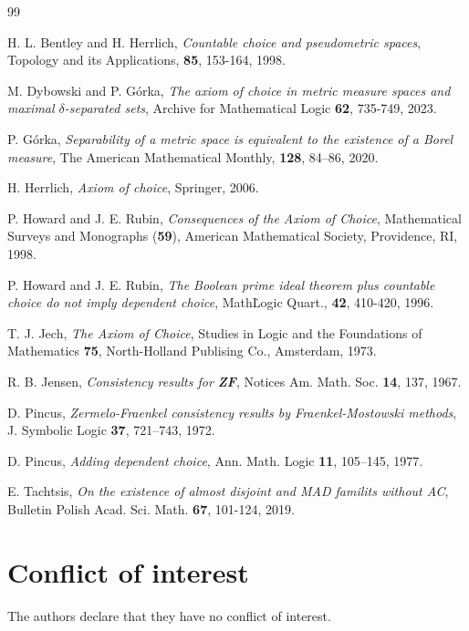 \documentclass[11pt, reqno]{amsart}
\theoremstyle{definition}
\numberwithin{theorem}{section}
\theoremstyle{definition}
\theoremstyle{definition}
\theoremstyle{definition}
\theoremstyle{definition}
\theoremstyle{definition}
\numberwithin{claim}{section}
\theoremstyle{definition}
\theoremstyle{definition}
\theoremstyle{definition}
\theoremstyle{definition}
\theoremstyle{definition}
\theoremstyle{remboldstyle}
\begin{document}

\begin{thebibliography}{99}

 H. L. Bentley and H. Herrlich, \textit{Countable choice and pseudometric spaces}, Topology and its Applications,
\textbf{85}, 153-164, 1998.

 M. Dybowski and P. G\'{o}rka, \textit{The axiom of choice in metric measure spaces and maximal $\delta$-separated sets}, Archive for Mathematical Logic \textbf{62}, 735-749, 2023.

 P. G\'{o}rka, \textit{Separability of a metric space is equivalent to the existence of a Borel measure}, The American Mathematical Monthly, \textbf{128}, 84--86, 2020.

 H. Herrlich, \textit{Axiom of choice}, Springer, 2006.

 P. Howard and J. E. Rubin, \textit{Consequences of the Axiom of Choice}, Mathematical Surveys and Monographs (\textbf{59}),  American Mathematical Society, Providence, RI, 1998.

 P. Howard and J. E. Rubin, \textit{The Boolean prime ideal theorem plus countable choice do not imply dependent choice}, Math\. Logic Quart., {\bf 42}, 410-420, 1996.

 T. J. Jech, \textit{The Axiom of Choice}, Studies in Logic and the Foundations of Mathematics \textbf{75}, North-Holland Publising Co., Amsterdam, 1973.

 R. B. Jensen, \textit{Consistency results for \textbf{ZF}}, Notices  Am. Math. Soc. \textbf{14}, 137, 1967.

 D. Pincus, \textit{Zermelo-Fraenkel consistency results by Fraenkel-Mostowski methods}, J. Symbolic Logic \textbf{37}, 721--743, 1972.

 D. Pincus, \textit{Adding dependent choice}, Ann. Math. Logic \textbf{11}, 105--145, 1977.

 E. Tachtsis,  \textit{On the existence of almost disjoint and MAD familits without \textsf{AC}},  Bulletin Polish Acad. Sci. Math. \textbf{67}, 101-124, 2019.


\end{thebibliography}
%
\section*{Conflict of interest}
%
 The authors declare that they have no conflict of interest.
\end{document}
